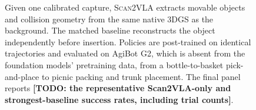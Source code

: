 \documentclass[letterpaper,10pt,conference]{ieeeconf}
\newcommand{\system}{\textsc{Scan2VLA}}
\newcommand{\todo}[1]{\textbf{[TODO: #1]}}
\begin{document}
\begin{figure}[t]
  \centering
  \caption{Given one calibrated capture, \system{} extracts movable objects and
  collision geometry from the same native 3DGS as the background. The matched
  baseline reconstructs the object independently before insertion. Policies are
  post-trained on identical trajectories and evaluated on AgiBot G2, which is
  absent from the foundation models' pretraining data, from a
  bottle-to-basket pick-and-place to picnic packing and trunk placement. The final panel
  reports \todo{the representative Scan2VLA-only and strongest-baseline success
  rates, including trial counts}.}
  \label{fig:teaser}
\end{figure}
\end{document}
